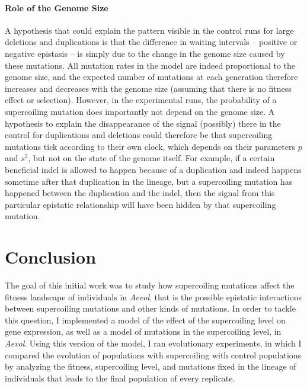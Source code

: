 \paragraph{Role of the Genome Size}
A hypothesis that could explain the pattern visible in the control runs for large deletions and duplications is that the difference in waiting intervals -- positive or negative epistasis -- is simply due to the change in the genome size caused by these mutations.
All mutation rates in the model are indeed proportional to the genome size, and the expected number of mutations at each generation therefore increases and decreases with the genome size (assuming that there is no fitness effect or selection).
However, in the experimental runs, the probability of a supercoiling mutation does importantly not depend on the genome size.
A hypothesis to explain the disappearance of the signal (possibly) there in the control for duplications and deletions could therefore be that supercoiling mutations tick according to their own clock, which depends on their parameters $p$ and $s^2$, but not on the state of the genome itself.
For example, if a certain beneficial indel is allowed to happen because of a duplication and indeed happens sometime after that duplication in the lineage, but a supercoiling mutation has happened between the duplication and the indel, then the signal from this particular epistatic relationship will have been hidden by that supercoiling mutation.

\section{Conclusion}
\label{sec:aevol:ccl}

The goal of this initial work was to study how supercoiling mutations affect the fitness landscape of individuals in \emph{Aevol}, that is the possible epistatic interactions between supercoiling mutations and other kinds of mutations.
In order to tackle this question, I implemented a model of the effect of the supercoiling level on gene expression, as well as a model of mutations in the supercoiling level, in \emph{Aevol}.
Using this version of the model, I ran evolutionary experiments, in which I compared the evolution of populations with supercoiling with control populations by analyzing the fitness, supercoiling level, and mutations fixed in the lineage of individuals that leads to the final population of every replicate.

